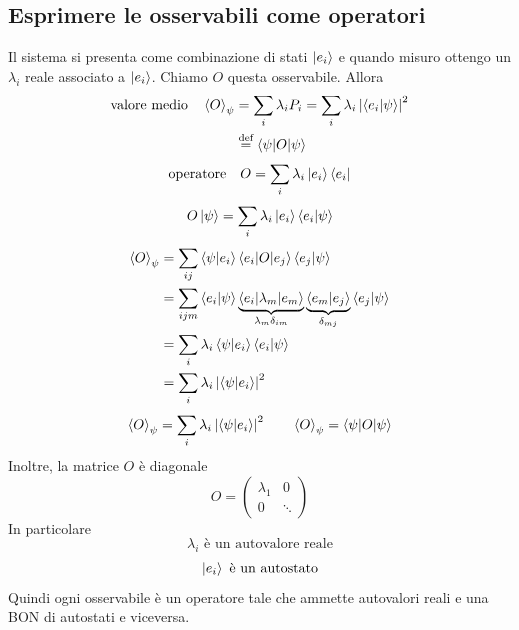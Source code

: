 \subsection{Esprimere le osservabili come operatori}
Il sistema si presenta come combinazione di stati \(\ket{e_i}\) e quando misuro
ottengo un \(\lambda_i\) reale associato a \(\ket{e_i}\). Chiamo \(O\) questa
osservabile. Allora
\begin{align*}
  \text{valore medio} \quad \braket{O}_\psi
  &= \sum_i \lambda_i P_i
  = \sum_i \lambda_i \left| \braket{e_i|\psi} \right|^2 \\
  &\stackrel{\text{def}}{=} \braket{\psi|O|\psi}
\end{align*}
\[
  \text{operatore} \quad O = \sum_i \lambda_i \ket{e_i} \bra{e_i}
\]
\[
  O \ket{\psi} = \sum_i \lambda_i \ket{e_i} \braket{e_i|\psi}
\]
\begin{align*}
  \braket{O}_\psi
  &= \sum_{ij} \braket{\psi|e_i} \braket{e_i|O|e_j} \braket{e_j|\psi} \\
  &= \sum_{ijm} \braket{e_i|\psi}
    \underbrace{\braket{e_i|\lambda_m|e_m}}_{\lambda_m \delta_{im}}
    \underbrace{\braket{e_m|e_j}}_{\delta_{mj}} \braket{e_j|\psi} \\
  &= \sum_i \lambda_i \braket{\psi|e_i} \braket{e_i|\psi} \\
  &= \sum_i \lambda_i \left| \braket{\psi|e_i} \right|^2
\end{align*}
\[
  \braket{O}_\psi = \sum_i \lambda_i \left| \braket{\psi|e_i} \right|^2
  \qquad
  \braket{O}_\psi = \braket{\psi|O|\psi}
\]
Inoltre, la matrice \(O\) è diagonale
\[
  O = \begin{pmatrix}
    \lambda_1 & 0 \\
    0 & \ddots
  \end{pmatrix}
\]
In particolare
\[
  \lambda_i \text{ è un autovalore reale}
\]
\[
  \ket{e_i} \text{ è un autostato}
\]
Quindi ogni osservabile è un operatore tale che ammette autovalori reali e una
BON di autostati e viceversa.

